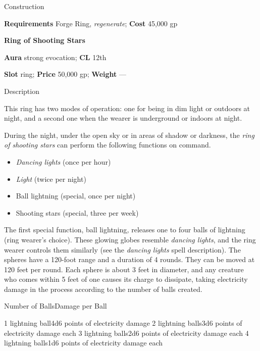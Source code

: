 Construction
				
\textbf{Requirements} Forge Ring, \textit{regenerate}; \textbf{Cost }45,000 gp
				
\textbf{Ring of Shooting Stars}
				
\textbf{Aura} strong evocation; \textbf{CL} 12th
				
\textbf{Slot} ring; \textbf{Price} 50,000 gp; \textbf{Weight} ---
				
Description
				
This ring has two modes of operation: one for being in dim light or outdoors at night, and a second one when the wearer is underground or indoors at night.
				
During the night, under the open sky or in areas of shadow or darkness, the \textit{ring of shooting stars }can perform the following functions on command.
				\begin{itemize}\item  \textit{Dancing lights} (once per hour)
				\item  \textit{Light} (twice per night)
				\item  Ball lightning (special, once per night)
				\item  Shooting stars (special, three per week)
\end{itemize}
				
The first special function, ball lightning\textit{, }releases one to four balls of lightning (ring wearer's choice). These glowing globes resemble \textit{dancing lights}, and the ring wearer controls them similarly (see the \textit{dancing lights }spell description). The spheres have a 120-foot range and a duration of 4 rounds. They can be moved at 120 feet per round. Each sphere is about 3 feet in diameter, and any creature who comes within 5 feet of one causes its charge to dissipate, taking electricity damage in the process according to the number of balls created.

Number of BallsDamage per Ball


1 lightning ball4d6 points of electricity damage
2 lightning balls3d6 points of electricity damage each
3 lightning balls2d6 points of electricity damage each
4 lightning balls1d6 points of electricity damage each

